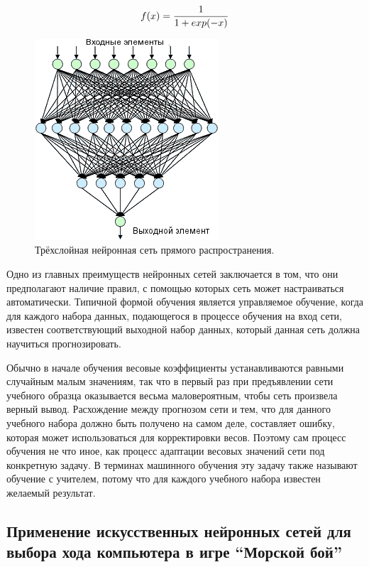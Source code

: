 \documentclass[12pt, a4paper, oneside]{article}
\begin{document}
\begin{equation}
f(x) = {1 \over {1+exp(-x)}}
\end{equation}

\begin{figure}
  \vspace{-0.5cm}
  \begin{center}
    \includegraphics[scale=0.61]{net.png}
  \end{center}
  \vspace{-0.3cm}
  \caption{Трёхслойная нейронная сеть прямого распространения.}
  \label{fig:net}
  \vspace{-0.55cm}
\end{figure}Одно из главных преимуществ нейронных сетей заключается в том, что они предполагают наличие правил, с помощью которых сеть может настраиваться автоматически. Типичной формой обучения является управляемое обучение, когда для каждого набора данных, подающегося в процессе обучения на вход сети, известен соответствующий выходной набор данных, который данная сеть должна научиться прогнозировать.

Обычно в начале обучения весовые коэффициенты устанавливаются равными случайным малым значениям, так что в первый раз при предъявлении сети учебного образца оказывается весьма маловероятным, чтобы сеть произвела верный вывод. Расхождение между прогнозом сети и тем, что для данного учебного набора должно быть получено на самом деле, составляет ошибку, которая может использоваться для корректировки весов. Поэтому сам процесс обучения не что иное, как процесс адаптации весовых значений сети под конкретную задачу. В терминах машинного обучения эту задачу также называют обучение с учителем, потому что для каждого учебного набора известен желаемый результат.

\subsection{Применение искусственных нейронных сетей для выбора хода компьютера в игре ``Морской бой''}
\end{document}
